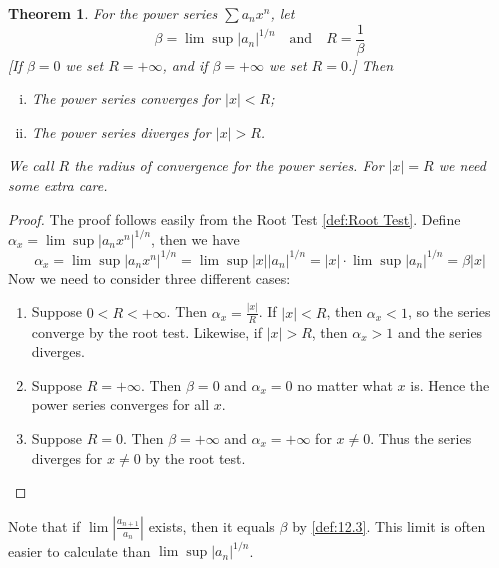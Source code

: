 \documentclass[12pt, lettersize]{book}
\newtheorem{thm}{Theorem}[section]
\begin{document}
			\begin{thm}\label{def:23.1}
			For the power series $\sum a_nx^n$, let
			\begin{displaymath}
				\beta=\lim\sup |a_n|^{1/n}\quad\text{and}\quad R=\frac{1}{\beta}
			\end{displaymath}
			[If $\beta=0$ we set $R=+\infty$, and if $\beta=+\infty$ we set $R=0$.] Then
			\begin{enumerate}[(i)]
				\item The power series converges for $|x|<R$;
				\item The power series diverges for $|x|>R$. 
			\end{enumerate}
			We call $R$ the \emph{radius of convergence} for the power series. For $|x|=R$ we need some extra care.
			\end{thm}
			\begin{proof}
			The proof follows easily from the Root Test \ref{def:Root Test}. Define $\alpha_x=\lim\sup|a_nx^n|^{1/n}$, then
			we have 
			\begin{displaymath}
				\alpha_x=\lim\sup|a_nx^n|^{1/n}=\lim\sup|x||a_n|^{1/n}=|x|\cdot\lim\sup|a_n|^{1/n}=\beta|x|
			\end{displaymath}
			Now we need to consider three different cases:
			\begin{enumerate}
				\item Suppose $0<R<+\infty$. Then $\alpha_x=\frac{|x|}{R}$. If $|x|<R$, then $\alpha_x<1$, so the series
				converge by the root test. Likewise, if $|x|>R$, then $\alpha_x>1$ and the series diverges.
				\item Suppose $R=+\infty$. Then $\beta=0$ and $\alpha_x=0$ no matter what $x$ is. Hence the power series
				converges for all $x$.
				\item Suppose $R=0$. Then $\beta=+\infty$ and $\alpha_x=+\infty$ for $x\neq0$. Thus the series diverges for
				$x\neq0$ by the root test.
			\end{enumerate}
			\end{proof}
			Note that if $\lim\left|\frac{a_{n+1}}{a_n}\right|$ exists, then it equals $\beta$ by \ref{def:12.3}. This limit
			is often easier to calculate than $\lim\sup|a_n|^{1/n}$.
			\newpage
\end{document}
